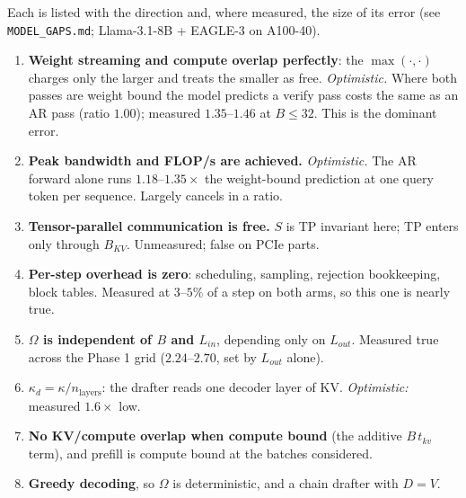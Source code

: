 \documentclass[11pt]{article}
\begin{document}
\noindent
Each is listed with the direction and, where measured, the size of its error
(see \texttt{MODEL\_GAPS.md}; Llama-3.1-8B + EAGLE-3 on A100-40).

\begin{enumerate}
  \item \textbf{Weight streaming and compute overlap perfectly}: the
    $\max(\cdot,\cdot)$ charges only the larger and treats the smaller as free.
    \emph{Optimistic.} Where both passes are weight bound the model predicts a
    verify pass costs the same as an AR pass (ratio $1.00$); measured
    $1.35$--$1.46$ at $B \le 32$. This is the dominant error.
  \item \textbf{Peak bandwidth and FLOP/s are achieved.} \emph{Optimistic.} The
    AR forward alone runs $1.18$--$1.35\times$ the weight-bound prediction at one
    query token per sequence. Largely cancels in a ratio.
  \item \textbf{Tensor-parallel communication is free.} $S$ is TP invariant
    here; TP enters only through $B_{KV}$. Unmeasured; false on PCIe parts.
  \item \textbf{Per-step overhead is zero}: scheduling, sampling, rejection
    bookkeeping, block tables. Measured at $3$--$5\%$ of a step on both arms, so
    this one is nearly true.
  \item \textbf{$\Omega$ is independent of $B$ and $L_{in}$}, depending only on
    $L_{out}$. Measured true across the Phase 1 grid ($2.24$--$2.70$, set by
    $L_{out}$ alone).
  \item \textbf{$\kappa_d = \kappa / n_{\mathrm{layers}}$}: the drafter reads
    one decoder layer of KV. \emph{Optimistic:} measured $1.6\times$ low.
  \item \textbf{No KV/compute overlap when compute bound} (the additive
    $B\,t_{kv}$ term), and prefill is compute bound at the batches considered.
  \item \textbf{Greedy decoding}, so $\Omega$ is deterministic, and a chain
    drafter with $D = V$.
\end{enumerate}
\end{document}
